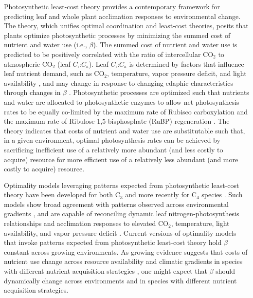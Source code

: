 Photosynthetic least-cost theory  provides a contemporary framework for predicting leaf and whole plant acclimation responses to environmental change. The theory, which unifies optimal coordination  and least-cost  theories, posits that plants optimize photosynthetic processes by minimizing the summed cost of nutrient and water use (i.e., $\beta$). The summed cost of nutrient and water use is predicted to be positively correlated with the ratio of intercellular CO$_2$ to atmospheric CO$_2$ (leaf $C_\mathrm{i}$:$C_\mathrm{a}$). Leaf $C_\mathrm{i}$:$C_\mathrm{a}$ is determined by factors that influence leaf nutrient demand, such as CO$_2$, temperature, vapor pressure deficit, and light availability , and may change in response to changing edaphic characteristics through changes in $\beta$ . Photosynthetic processes are optimized such that nutrients and water are allocated to photosynthetic enzymes to allow net photosynthesis rates to be equally co-limited by the maximum rate of Rubisco carboxylation and the maximum rate of Ribulose-1,5-bisphosphate (RuBP) regeneration . The theory indicates that costs of nutrient and water use are substitutable such that, in a given environment, optimal photosynthesis rates can be achieved by sacrificing inefficient use of a relatively more abundant (and less costly to acquire) resource for more efficient use of a relatively less abundant (and more costly to acquire) resource.

Optimality models leveraging patterns expected from photosynthetic least-cost theory have been developed for both C$_3$  and more recently for C$_4$ species . Such models show broad agreement with patterns observed across environmental gradients , and are capable of reconciling dynamic leaf nitrogen-photosynthesis relationships and acclimation responses to elevated CO$_2$, temperature, light availability, and vapor pressure deficit . Current versions of optimality models that invoke patterns expected from photosynthetic least-cost theory hold $\beta$ constant across growing environments. As growing evidence suggests that costs of nutrient use change across resource availability and climatic gradients in species with different nutrient acquisition strategies , one might expect that $\beta$ should dynamically change across environments and in species with different nutrient acquisition strategies.

